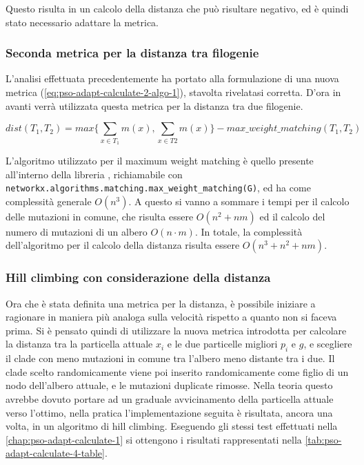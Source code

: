 Questo risulta in un calcolo della distanza che può risultare negativo, ed è quindi stato necessario adattare la metrica.

\subsubsection{Seconda metrica per la distanza tra filogenie}
\label{chap:pso-adapt-calculate-3}
L'analisi effettuata precedentemente ha portato alla formulazione di una nuova metrica (\autoref{eq:pso-adapt-calculate-2-algo-1}), stavolta rivelatasi corretta. D'ora in avanti verrà utilizzata questa metrica per la distanza tra due filogenie.

\begin{equation}
  \label{eq:pso-adapt-calculate-2-algo-1}
  dist(T_1, T_2) = max \{ \sum_{x \in T_1} m(x), \sum_{x \in T2} m(x) \} - max\_weight\_matching(T_1, T_2)
\end{equation}

L'algoritmo utilizzato per il maximum weight matching è quello presente all'interno della libreria , 
richiamabile con \texttt{networkx.algorithms.matching.max\_weight\_matching(G)}, ed ha come complessità generale $O(n^3)$. A questo si vanno a sommare i tempi per il calcolo delle mutazioni in comune, che risulta essere $O(n^2 + nm)$ ed il calcolo del numero di mutazioni di un albero $O(n \cdot m)$. In totale, la complessità dell'algoritmo per il calcolo della distanza risulta essere $O(n^3 + n^2 + nm)$.

\subsubsection{Hill climbing con considerazione della distanza}
\label{chap:pso-adapt-calculate-4}
Ora che è stata definita una metrica per la distanza, è possibile iniziare a ragionare in maniera più analoga sulla velocità rispetto a quanto non si faceva prima. Si è pensato quindi di utilizzare la nuova metrica introdotta per calcolare la distanza tra la particella attuale $x_i$ e le due particelle migliori $p_i$ e $g$, e scegliere il clade con meno mutazioni in comune tra l'albero meno distante tra i due. Il clade scelto randomicamente viene poi inserito randomicamente come figlio di un nodo dell'albero attuale, e le mutazioni duplicate rimosse. Nella teoria questo avrebbe dovuto portare ad un graduale avvicinamento della particella attuale verso l'ottimo, nella pratica l'implementazione seguita è risultata, ancora una volta, in un algoritmo di hill climbing.
Eseguendo gli stessi test effettuati nella \autoref{chap:pso-adapt-calculate-1} si ottengono i risultati rappresentati nella \autoref{tab:pso-adapt-calculate-4-table}. 


